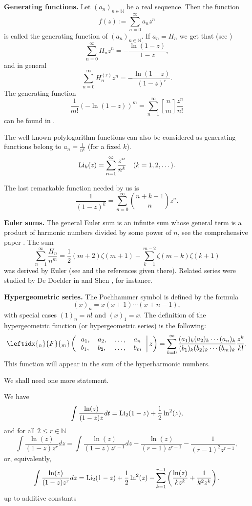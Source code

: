 \documentclass[a4paper,12pt]{amsart}
\begin{document}
\textbf{Generating functions.} Let $(a_n)_{n\in{\mathbb{N}}}$ be a real sequence. Then the function
\[f(z):=\sum_{n=0}^\infty a_nz^n\]
is called the generating function of $(a_n)_{n\in{\mathbb{N}}}$.
If $a_n=H_n$ we get that (see \cite{GKP,BGG})
\[\sum_{n=0}^\infty H_nz^n=-\frac{\ln(1-z)}{1-z},\]
and in general
\begin{equation}
\sum_{n=0}^\infty H_n^{(r)}z^n=-\frac{\ln(1-z)}{(1-z)^r}.\label{genfunc_Hnr}
\end{equation}
The generating function
\begin{equation}
\frac{1}{m!}\left(-\ln(1-z)\right)^m=\sum_{n=1}^\infty{\genfrac[]{0pt}{}{{n}}{{m}}}\frac{z^n}{n!}\label{genfunc_stirling}
\end{equation}
can be found in \cite{GKP,B}.

The well known polylogarithm functions can also be considered as generating functions belong to $a_n=\frac{1}{n^k}$ (for a fixed $k$).
\[{\mathop{\textup{Li}}\nolimits}_k(z)=\sum_{n=1}^\infty\frac{z^n}{n^k}\quad(k=1,2,\dots).\]

The last remarkable function needed by us is
\[\frac{1}{(1-z)^k}=\sum_{n=0}^\infty\binom{n+k-1}{n}z^n.\]

\textbf{Euler sums.} The general Euler sum is an infinite sum whose general term is a product of harmonic numbers divided by some power of $n$, see the comprehensive paper \cite{FS}. The sum
\[\sum_{n=1}^\infty\frac{H_n}{n^m}=\frac{1}{2}(m+2)\zeta(m+1)-\sum_{k=1}^{m-2}\zeta(m-k)\zeta(k+1)\]
was derived by Euler (see \cite{BB} and the references given there). Related series were studied by De Doelder in \cite{dD} and Shen \cite{S}, for instance.

\textbf{Hypergeometric series.} The Pochhammer symbol is defined by the formula
\begin{equation}
(x)_n=x(x+1)\cdots(x+n-1),\label{pochhammer}
\end{equation}
with special cases $(1)_n=n!$ and $(x)_1=x$. The definition of the hypergeometric function (or hypergeometric series) is the following:
\[\leftidx{_n}{F}{_m}\left(\left.\begin{tabular}{llll}$a_1,$&$a_2,$&$\dots,$&$a_n$\\$b_1,$&$b_2$,&$\dots,$&$b_m$\end{tabular}\right|z\right)=\sum_{k=0}^\infty\frac{(a_1)_k(a_2)_k\cdots(a_n)_k}{(b_1)_k(b_2)_k\cdots(b_m)_k}\frac{z^k}{k!}.\]
This function will appear in the sum of the hyperharmonic numbers.

We shall need one more statement.
\begin{Lemma}We have
\[\int\frac{\ln(z)}{(1-z)z}dt={\mathop{\textup{Li}}\nolimits}_2(1-z)+\frac{1}{2}\ln^2(z),\]
and for all $2\le r\in{\mathbb{N}}$
\[\int\frac{\ln(z)}{(1-z)z^r}dz=\int\frac{\ln(z)}{(1-z)z^{r-1}}dz-\frac{\ln(z)}{(r-1)z^{r-1}}-\frac{1}{(r-1)^2z^{r-1}},\]
or, equivalently,
\[\int\frac{\ln(z)}{(1-z)z^r}dz={\mathop{\textup{Li}}\nolimits}_2(1-z)+\frac{1}{2}\ln^2(z)-\sum_{k=1}^{r-1}\left(\frac{\ln(z)}{kz^k}+\frac{1}{k^2z^k}\right).\]
up to additive constants
\end{Lemma}
\end{document}
